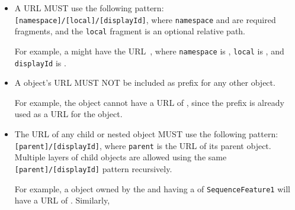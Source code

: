 \begin{itemize}

 \item A  URL MUST use the following pattern:
  \texttt{[namespace]/[local]/[displayId]},  where \texttt{namespace} and  are required fragments, and the \texttt{local} fragment is an optional relative path.
  
  	For example, a  might have the URL~, where \texttt{namespace} is , \texttt{local} is , and \texttt{displayId} is .

  \item A  object's URL MUST NOT be included as prefix for any other  object.
  
  	For example, the   object cannot have a URL of , since the  prefix is already used as a URL for the   object.

  \item The URL of any child or nested object MUST use the following pattern:\texttt{[parent]/[displayId]}, where \texttt{parent} is the URL of its parent object.
	Multiple layers of child objects are allowed using the same\\ \texttt{[parent]/[displayId]} pattern recursively.
	
	For example, a  object owned by the   and having a  of  \texttt{SequenceFeature1} will have a URL of .
	Similarly,  
  \end{itemize}

